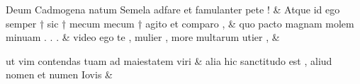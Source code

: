 \documentclass[12pt,onecolumn,twoside,a4paper]{memoir}
\begin{document}
\begin{pairs}
\begin{Leftside}
                              Deum
                              Cadmogena
                              natum
                              Semela
                              adfare
                              et
                              famulanter
                              pete
                              ! \&
                         \stanza {}Atque
                              id
                              ego
                              semper
                              †
                              sic
                              †
                              mecum
                              {mecum}
                              †
                              agito
                              et
                              comparo
                              , & 
                     quo
                              pacto
                              magnam
                              molem
                              minuam
                              .
                              .
                              . \&
                         \stanza {}video
                              ego
                              te
                              ,
                              mulier
                              ,
                              more
                              multarum
                              utier
                              , & 
                     
                              ut
                              vim
                              contendas
                              tuam
                              ad
                              maiestatem
                              viri \&
                         \stanza {}
                     alia
                              hic
                              sanctitudo
                              est
                              ,
                              aliud
                              nomen
                              et
                              numen
                              Iovis \&
                         \stanza {}
                     

\end{Leftside}
\end{pairs}
\end{document}
